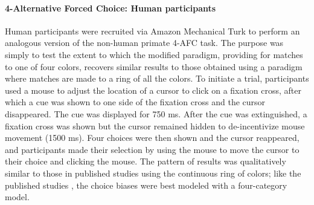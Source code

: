 \paragraph{4-Alternative Forced Choice: Human participants}
Human participants were recruited via Amazon Mechanical Turk to perform an analogous version of the non-human primate 4-AFC task. 
The purpose was simply to test the extent to which the modified paradigm, providing for matches to one of four colors, recovers similar results to those obtained using a paradigm where matches are made to a ring of all the colors.  
To initiate a trial, participants used a mouse to adjust the location of a cursor to click on a fixation cross, after which a cue was shown to one side of the fixation cross and the cursor disappeared. 
The cue was displayed for 750 ms. 
After the cue was extinguished, a fixation cross was shown but the cursor remained hidden to de-incentivize mouse movement (1500 ms). 
Four choices were then shown and the cursor reappeared, and participants made their selection by using the mouse to move the cursor to their choice and clicking the mouse. 
The pattern of results %
was qualitatively similar to those in published studies using the continuous ring of colors; like the published studies \citep{bae_why_2015,panichello_error-correcting_2019}, the choice biases were best modeled with a four-category model. 
